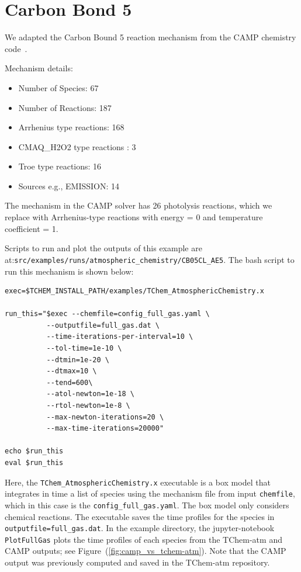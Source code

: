 \documentclass[report, 12pt]{SANDreport}
\begin{document}
\section{Carbon Bond 5}

We adapted the Carbon Bound 5 reaction mechanism from the CAMP chemistry code~\cite{campweb,Dawson2022}.

Mechanism details:

\begin{itemize}
\item Number of Species: 67
\item Number of Reactions: 187
\item Arrhenius type reactions: 168
\item CMAQ\_H2O2 type reactions : 3
\item Troe type reactions: 16
\item Sources e.g., EMISSION: 14
\end{itemize}

The mechanism in the CAMP solver has 26 photolysis reactions, which we replace with Arrhenius-type reactions with energy = 0  and temperature coefficient = 1.

Scripts to run and plot the outputs of this example are at:\Verb|src/examples/runs/atmospheric_chemistry/CB05CL_AE5|. The bash script to run this mechanism is shown below:


\begin{Verbatim}
exec=$TCHEM_INSTALL_PATH/examples/TChem_AtmosphericChemistry.x

run_this="$exec --chemfile=config_full_gas.yaml \
          --outputfile=full_gas.dat \
          --time-iterations-per-interval=10 \
          --tol-time=1e-10 \
          --dtmin=1e-20 \
          --dtmax=10 \
          --tend=600\
          --atol-newton=1e-18 \
          --rtol-newton=1e-8 \
          --max-newton-iterations=20 \
          --max-time-iterations=20000"

echo $run_this
eval $run_this
\end{Verbatim}

Here, the \verb|TChem_AtmosphericChemistry.x| executable is a box model that integrates in time a list of species using the mechanism file from input \verb|chemfile|, which in this case is the \verb|config_full_gas.yaml|. The box model only considers chemical reactions. The executable saves the time profiles for the species in \verb|outputfile=full_gas.dat|. In the example directory, the jupyter-notebook \verb|PlotFullGas| plots the time profiles of each species from the TChem-atm and CAMP outputs; see Figure~(\ref{fig:camp_vs_tchem-atm}). Note that the CAMP output was previously computed and saved in the TChem-atm repository.
\end{document}
